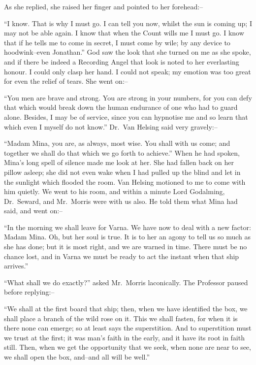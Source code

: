 \documentclass[12pt,openright]{book}
\begin{document}
As she replied, she raised her finger and pointed to her forehead:–

“I know. That is why I must go. I can tell you now, whilst the sun is coming up; I may not be able again. I know that when the Count wills me I must go. I know that if he tells me to come in secret, I must come by wile; by any device to hoodwink–even Jonathan.” God saw the look that she turned on me as she spoke, and if there be indeed a Recording Angel that look is noted to her everlasting honour. I could only clasp her hand. I could not speak; my emotion was too great for even the relief of tears. She went on:–

“You men are brave and strong. You are strong in your numbers, for you can defy that which would break down the human endurance of one who had to guard alone. Besides, I may be of service, since you can hypnotise me and so learn that which even I myself do not know.” Dr. Van Helsing said very gravely:–

“Madam Mina, you are, as always, most wise. You shall with us come; and together we shall do that which we go forth to achieve.” When he had spoken, Mina’s long spell of silence made me look at her. She had fallen back on her pillow asleep; she did not even wake when I had pulled up the blind and let in the sunlight which flooded the room. Van Helsing motioned to me to come with him quietly. We went to his room, and within a minute Lord Godalming, Dr. Seward, and Mr. Morris were with us also. He told them what Mina had said, and went on:–

“In the morning we shall leave for Varna. We have now to deal with a new factor: Madam Mina. Oh, but her soul is true. It is to her an agony to tell us so much as she has done; but it is most right, and we are warned in time. There must be no chance lost, and in Varna we must be ready to act the instant when that ship arrives.”

“What shall we do exactly?” asked Mr. Morris laconically. The Professor paused before replying:–

“We shall at the first board that ship; then, when we have identified the box, we shall place a branch of the wild rose on it. This we shall fasten, for when it is there none can emerge; so at least says the superstition. And to superstition must we trust at the first; it was man’s faith in the early, and it have its root in faith still. Then, when we get the opportunity that we seek, when none are near to see, we shall open the box, and–and all will be well.”
\end{document}
